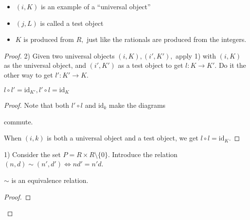 \begin{rmk}

\begin{itemize}
	\item $(i,K)$ is an example of a ``universal object''
	\item $(j,L)$ is called a test object
	\item $K$ is produced from $R,$ just like the rationals are produced from the integers.
\end{itemize}

\end{rmk}
\begin{proof}

2) Given two universal objects $(i,K),(i',K'),$ apply 1) with $(i,K)$ as the universal object, and $(i',K')$ as a test object to get $l:K\rightarrow K'$. Do it the other way to get $l':K'\longrightarrow K.$

\begin{claim}

$l\circ l'=\text{id}_{K'},l'\circ l=\text{id}_K$

\begin{proof}

Note that both $l'\circ l$ and $\text{id}_k$ make the diagrams


 commute.

When $(i,k)$ is both a universal object and a test object, we get $l\circ l=\text{id}_K.$ \end{proof}
\end{claim}


1) Consider the set $P=R\times R\setminus\{0\}$. Introduce the relation $(n,d)\sim (n',d')\iff nd'=n'd$.

\begin{claim}

$\sim$ is an equivalence relation.

\begin{proof}


\end{proof}
\end{claim}
\end{proof}

